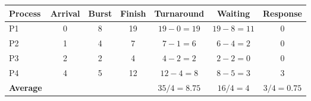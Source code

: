 \begin{tabular}{@{}lcccccc@{}}
\toprule
\textbf{Process} & \textbf{Arrival} & \textbf{Burst} & \textbf{Finish} & \textbf{Turnaround} & \textbf{Waiting} & \textbf{Response}\\
\midrule
P1 & 0 & 8 & 19 & $19-0=19$ & $19-8=11$ & 0\\
P2 & 1 & 4 & 7 & $7-1=6$ & $6-4=2$ & 0\\
P3 & 2 & 2 & 4 & $4-2=2$ & $2-2=0$ & 0\\
P4 & 4 & 5 & 12 & $12-4=8$ & $8-5=3$ & 3\\
\midrule
\textbf{Average} &  &  &  & $35/4=8.75$ & $16/4=4$ & $3/4=0.75$\\
\bottomrule
\end{tabular}
